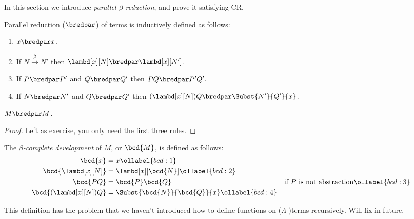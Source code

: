 \documentclass[../../../include/open-logic-section]{subfiles}
\begin{document}


In this section we introduce \emph{parallel $\beta$-reduction}, and prove it satisfying CR.

\begin{defn} 
  Parallel reduction ($\bredpar$) of terms is inductively defined as follows:
  \begin{enumerate}
    \item {} $x \bredpar x$.
    \item {} If $N \xrightarrow{\beta} N'$ then $\lambd[x][N] \bredpar
      \lambd[x][N']$.
    \item {} If $P \bredpar P'$ and $Q \bredpar Q'$ then $PQ \bredpar
      P'Q'$.
    \item {} If $N \bredpar N'$ and $Q \bredpar Q'$ then
      $(\lambd[x][N])Q \bredpar \Subst{N'}{Q'}{x}$.
  \end{enumerate}
\end{defn}

\begin{thm}
  $M \bredpar M$.
\end{thm}
\begin{proof}
  Left as exercise, you only need the first three rules.
\end{proof}

\begin{defn}
  The \emph{$\beta$-complete development} of $M$, or $\bcd{M}$, is defined
  as follows:
  \begin{align}
    \bcd{x} &= x \ollabel{bcd:1} \\
    \bcd{\lambd[x][N]} &= \lambd[x][\bcd{N}] \ollabel{bcd:2}\\
    \bcd{PQ} &= \bcd{P}\bcd{Q} && \text{if $P$ is not abstraction} \ollabel{bcd:3} \\
    \bcd{(\lambd[x][N])Q} &= \Subst{\bcd{N}}{\bcd{Q}}{x} \ollabel{bcd:4}
  \end{align}
\end{defn}

\begin{editorial}
  This definition has the problem that we haven't introduced how to
  define functions on ($\Lambda$-)terms recursively. Will fix in future.
\end{editorial}
\end{document}
